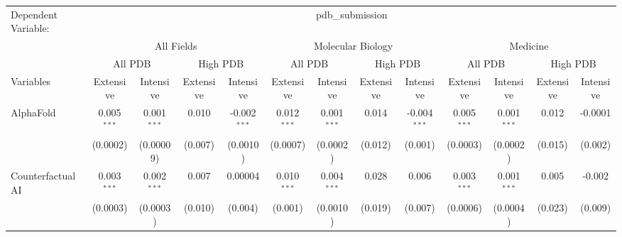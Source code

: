 \begingroup
\centering
\begin{tabular}{lcccccccccccc}
   \tabularnewline \midrule \midrule
   Dependent Variable: & \multicolumn{12}{c}{pdb\_submission}\\
 & \multicolumn{4}{c}{All Fields} & \multicolumn{4}{c}{Molecular Biology} & \multicolumn{4}{c}{Medicine} \\
\cmidrule(lr){2-5} \cmidrule(lr){6-9} \cmidrule(lr){10-13}
 & \multicolumn{2}{c}{All PDB} & \multicolumn{2}{c}{High PDB} & \multicolumn{2}{c}{All PDB} & \multicolumn{2}{c}{High PDB} & \multicolumn{2}{c}{All PDB} & \multicolumn{2}{c}{High PDB} \\
\cmidrule(lr){2-3} \cmidrule(lr){4-5} \cmidrule(lr){6-7} \cmidrule(lr){8-9} \cmidrule(lr){10-11} \cmidrule(lr){12-13}
Variables & \multicolumn{1}{c}{Extensive} & \multicolumn{1}{c}{Intensive} & \multicolumn{1}{c}{Extensive} & \multicolumn{1}{c}{Intensive} & \multicolumn{1}{c}{Extensive} & \multicolumn{1}{c}{Intensive} & \multicolumn{1}{c}{Extensive} & \multicolumn{1}{c}{Intensive} & \multicolumn{1}{c}{Extensive} & \multicolumn{1}{c}{Intensive} & \multicolumn{1}{c}{Extensive} & \multicolumn{1}{c}{Intensive} \\
\cmidrule(lr){1-1}\cmidrule(lr){2-2} \cmidrule(lr){3-3} \cmidrule(lr){4-4} \cmidrule(lr){5-5} \cmidrule(lr){6-6} \cmidrule(lr){7-7} \cmidrule(lr){8-8} \cmidrule(lr){9-9} \cmidrule(lr){10-10} \cmidrule(lr){11-11} \cmidrule(lr){12-12} \cmidrule(lr){13-13}
   AlphaFold                                & 0.005$^{***}$  & 0.001$^{***}$    & 0.010   & -0.002$^{***}$ & 0.012$^{***}$  & 0.001$^{***}$   & 0.014         & -0.004$^{***}$ & 0.005$^{***}$  & 0.001$^{***}$    & 0.012        & -0.0001\\   
                                            & (0.0002)       & (0.00009)        & (0.007) & (0.0010)       & (0.0007)       & (0.0002)        & (0.012)       & (0.001)        & (0.0003)       & (0.0002)         & (0.015)      & (0.002)\\   
   Counterfactual AI                        & 0.003$^{***}$  & 0.002$^{***}$    & 0.007   & 0.00004        & 0.010$^{***}$  & 0.004$^{***}$   & 0.028         & 0.006          & 0.003$^{***}$  & 0.001$^{***}$    & 0.005        & -0.002\\   
                                            & (0.0003)       & (0.0003)         & (0.010) & (0.004)        & (0.001)        & (0.0010)        & (0.019)       & (0.007)        & (0.0006)       & (0.0004)         & (0.023)      & (0.009)\\   

\end{tabular}
